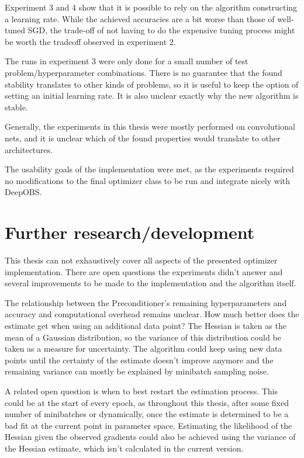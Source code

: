 \documentclass[twoside,12pt,a4paper]{report}
\begin{document}
Experiment 3 and 4 show that it is possible to rely on the algorithm constructing a learning rate. While the achieved accuracies are a bit worse than those of well-tuned SGD, the trade-off of not having to do the expensive tuning process might be worth the tradeoff observed in experiment 2.

The runs in experiment 3 were only done for a small number of test problem/hyperparameter combinations. There is no guarantee that the found stability translates to other kinds of problems, so it is useful to keep the option of setting an initial learning rate. It is also unclear exactly why the new algorithm is stable.

Generally, the experiments in this thesis were mostly performed on convolutional nets, and it is unclear which of the found properties would translate to other architectures.

The usability goals of the implementation were met, as the experiments required no modifications to the final optimizer class to be run and integrate nicely with DeepOBS.

\section{Further research/development}
This thesis can not exhaustively cover all aspects of the presented optimizer implementation. There are open questions the experiments didn't answer and several improvements to be made to the implementation and the algorithm itself.

The relationship between the Preconditioner's remaining hyperparameters and accuracy and computational overhead remains unclear. How much better does the estimate get when using an additional data point? The Hessian is taken as the mean of a Gaussian distribution, so the variance of this distribution could be taken as a measure for uncertainty. The algorithm could keep using new data points until the certainty of the estimate doesn't improve anymore and the remaining variance can mostly be explained by minibatch sampling noise.

A related open question is when to best restart the estimation process. This could be at the start of every epoch, as throughout this thesis, after some fixed number of minibatches or dynamically, once the estimate is determined to be a bad fit at the current point in parameter space. Estimating the likelihood of the Hessian given the observed gradients could also be achieved using the variance of the Hessian estimate, which isn't calculated in the current version.
\end{document}
